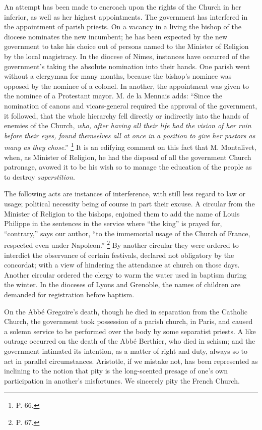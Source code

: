 An attempt has been made to encroach upon the
rights of the Church in her inferior, as well as her highest
appointments. The government has interfered in the appointment of
parish priests. On a vacancy in a living the bishop of the diocese
nominates the new incumbent; he has been expected by the new
government to take his choice out of persons named to the Minister of
Religion by the local magistracy. In the diocese of Nimes, instances
have occurred of the government's taking the absolute nomination into
their hands. One parish went without a clergyman for many months,
because the bishop's nominee was opposed by the nominee of a colonel.
In another, the appointment was given to the nominee of a Protestant
mayor. M. de la Mennais adds: ``Since the nomination of canons and
vicars-general required the approval of the government, it followed,
that the whole hierarchy fell directly or indirectly into the hands of
enemies of the Church, \emph{who, after having all their life had the
vision of her ruin before their eyes, found themselves all at once in
a position to give her pastors as many as they chose}.'' \footnote{P. 66.} It is an edifying comment on this fact that M. Montalivet,
when, as Minister of Religion, he had the disposal of all the
government Church patronage, avowed it to be his wish so to manage the
education of the people as to destroy \emph{superstition}.

The following acts are instances of interference,
with still less regard to law or usage; political necessity being of
course in part their excuse. A circular from the Minister of Religion
to the bishops, enjoined them to add the name of Louis Philippe in the
sentences in the service where ``the king'' is prayed for, ``contrary,''
says our author, ``to the immemorial usage of the Church of France,
respected even under Napoleon.'' \footnote{P. 67.} By another circular they were ordered to interdict the
observance of certain festivals, declared not obligatory by the
concordat; with a view of hindering the attendance at church on those
days. Another circular ordered the clergy to warm the water used in
baptism during the winter. In the dioceses of Lyons and Grenoble, the
names of children are demanded for registration before baptism.

On the Abbé Gregoire's death, though he died in
separation from the Catholic Church, the government took possession of
a parish church, in Paris, and caused a solemn service to be performed
over the body by some separatist priests. A like outrage occurred on
the death of the Abbé Berthier, who died in schism; and the
government intimated its intention, as a matter of right and duty,
always so to act in parallel circumstances. Aristotle, if we mistake
not, has been represented as inclining to the notion that pity is the
long-scented presage of one's own participation in another's
misfortunes. We sincerely pity the French Church.

